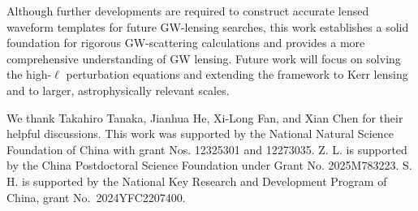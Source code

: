 \documentclass[reprint,amsmath,amssymb,aps,prd]{revtex4-2}
\begin{document}
Although further developments are required to construct accurate lensed waveform templates for future GW-lensing searches, this work establishes a solid foundation for rigorous GW-scattering calculations and provides a more comprehensive understanding of GW lensing. Future work will focus on solving the high-$\ell$ perturbation equations and extending the framework to Kerr lensing and to larger, astrophysically relevant scales.

\begin{acknowledgements}
We thank Takahiro Tanaka, Jianhua He, Xi-Long Fan, and Xian Chen for their helpful discussions.     
This work was supported by the
National Natural Science Foundation of China with grant Nos.
12325301 and 12273035.
Z. L. is supported by the China Postdoctoral Science
Foundation under Grant No. 2025M783223.
S. H. is supported by the National Key Research and Development Program of China, grant No.~2024YFC2207400.
\end{acknowledgements}
\end{document}

